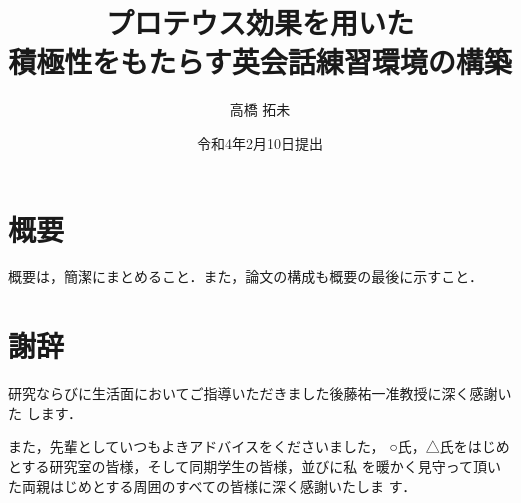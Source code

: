 \documentclass[12pt,dvipdfmx]{jreport}
\begin{document}

\title{プロテウス効果を用いた\\積極性をもたらす英会話練習環境の構築}


\author{高橋 拓未}


\date{令和4年2月10日提出}




\maketitle


\setcounter{page}{1}
\chapter*{概要}

 概要は，簡潔にまとめること．また，論文の構成も概要の最後に示すこと．



\chapter*{謝辞}


研究ならびに生活面においてご指導いただきました後藤祐一准教授に深く感謝いた
します．

また，先輩としていつもよきアドバイスをくださいました，
○氏，△氏をはじめとする研究室の皆様，そして同期学生の皆様，並びに私
を暖かく見守って頂いた両親はじめとする周囲のすべての皆様に深く感謝いたしま
す．
\end{document}

